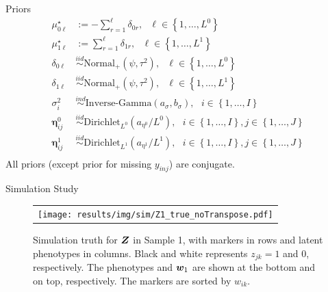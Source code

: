\documentclass[ignorenonframetext,]{beamer}
\newcommand{\iid}{\overset{iid}{\sim}}
\newcommand{\bc}[1]{ \left\{#1\right\} }
\newcommand{\true}{{\mbox{\tiny TR}}}
\newcommand{\bZ}{\mbox{\boldmath $Z$}}
\newcommand{\bw}{\mbox{\boldmath $w$}}
\newcommand{\ind}{\overset{ind}{\sim}}
\def\mus{\mu^\star}
\begin{document}
\begin{frame}{Priors}
\begin{align*}
\mus_{0\ell} &:= -\sum_{r=1}^\ell \delta_{0r}, ~~~ \ell \in \bc{1, \dots,L^0} \\
\mus_{1\ell} &:= \sum_{r=1}^\ell \delta_{1r}, ~~~ \ell \in \bc{1, \dots,L^1} \\
\delta_{0\ell} &\iid \text{Normal}_+(\psi, \tau^2), ~~~ \ell \in \bc{1, \dots,L^0} \\
\delta_{1\ell} &\iid \text{Normal}_+(\psi, \tau^2), ~~~ \ell \in \bc{1, \dots,L^1} \\
\sigma^2_i &\ind \text{Inverse-Gamma}(a_\sigma, b_\sigma), ~~~ i \in \bc{1, \dots, I} \\
\bm\eta^0_{ij} &\iid \text{Dirichlet}_{L^0}(a_{\eta^0}/L^0), ~~~ i \in \bc{1, \dots,I}, j \in \bc{1, \dots,J} \\
\bm\eta^1_{ij} &\iid \text{Dirichlet}_{L^1}(a_{\eta^1}/L^1), ~~~ i \in \bc{1, \dots,I}, j \in \bc{1, \dots,J} \\
\end{align*}
All priors (except prior for missing $y_{inj}$) are conjugate.
\end{frame}


\begin{frame}{Simulation Study}
\begin{figure}
\begin{center}
\begin{tabular}{c}
\texttt{[image: results/img/sim/Z1\_true\_noTranspose.pdf]}
\end{tabular}
\end{center}
\vspace{-0.05in} \caption{Simulation truth for $\bZ$ in Sample 1, with markers in
rows and latent phenotypes in columns. Black and white represents
$z_{jk}=1$ and 0, respectively. The phenotypes and $\bw_1$ are
shown at the bottom and on top, respectively. The markers
are sorted by $w_{ik}$.}
\end{figure}
\end{frame}
\end{document}
